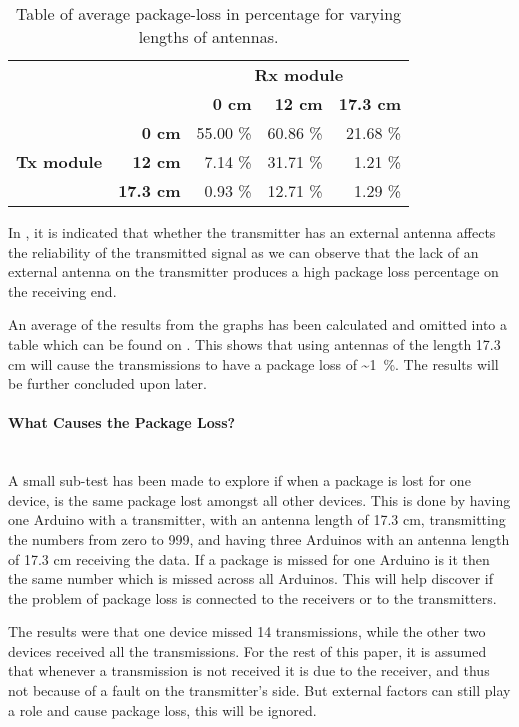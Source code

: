 \begin{table}[ht]
\centering
\begin{tabular}{r r r r r}    \toprule
 && \multicolumn{3}{c}{\textbf{Rx module}}\\
 && \textbf{0 cm}    & \textbf{12 cm}    & \textbf{17.3 cm}  \\\midrule
\multirow{3}{*}{\textbf{Tx module}}  &\textbf{0 cm} & 55.00 \%   & 60.86 \% & 21.68 \% \\ 
 &\textbf{12 cm} & 7.14 \% & 31.71 \% & 1.21 \%  \\ 
 &\textbf{17.3 cm} & 0.93 \% & 12.71 \% & 1.29 \%  \\\bottomrule
 \hline
\end{tabular} 
\caption{Table of average package-loss in percentage for varying lengths of antennas.}
\label{tbl:packageloss}
\end{table}

\bigskip
\noindent
In , it is indicated that whether the transmitter has an external antenna affects the reliability of the transmitted signal as we can observe that the lack of an external antenna on the transmitter produces a high package loss percentage on the receiving end.

An average of the results from the graphs has been calculated and omitted into a table which can be found on . 
This shows that using antennas of the length 17.3 cm will cause the transmissions to have a package loss of \textasciitilde1~\%.
The results will be further concluded upon later.

\paragraph{What Causes the Package Loss?}\label{par:wctpl}\hfill \\
A small sub-test has been made to explore if when a package is lost for one device, is the same package lost amongst all other devices.
This is done by having one Arduino with a transmitter, with an antenna length of 17.3 cm, transmitting the numbers from zero to 999, and having three Arduinos with an antenna length of 17.3 cm receiving the data. 
If a package is missed for one Arduino is it then the same number which is missed across all Arduinos.
This will help discover if the problem of package loss is connected to the receivers or to the transmitters.

The results were that one device missed 14 transmissions, while the other two devices received all the transmissions.
For the rest of this paper, it is assumed that whenever a transmission is not received it is due to the receiver, and thus not because of a fault on the transmitter's side.
But external factors can still play a role and cause package loss, this will be ignored.

